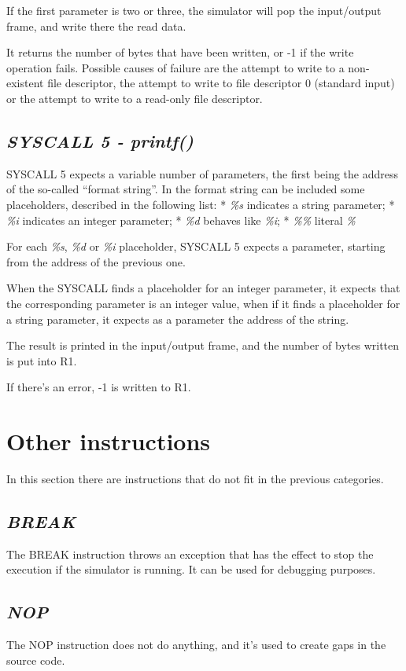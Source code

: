 \documentclass[letterpaper,10pt,english]{sphinxmanual}
\begin{document}
If the first parameter is two or three, the simulator will pop the input/output
frame, and write there the read data.

It returns the number of bytes that have been written, or -1 if the write
operation fails. Possible causes of failure are the attempt to write to a
non-existent file descriptor, the attempt to write to file descriptor 0
(standard input) or the attempt to write to a read-only file descriptor.


\subsection{\emph{SYSCALL 5 - printf()}}
\label{instructions:syscall-5-printf}
SYSCALL 5 expects a variable number of parameters, the first being the address
of the so-called ``format string''. In the format string can be included some
placeholders, described in the following list:
* \emph{\%s} indicates a string parameter;
* \emph{\%i} indicates an integer parameter;
* \emph{\%d} behaves like \emph{\%i};
* \emph{\%\%} literal \emph{\%}

For each \emph{\%s}, \emph{\%d} or \emph{\%i} placeholder, SYSCALL 5 expects a parameter,
starting from the address of the previous one.

When the SYSCALL finds a placeholder for an integer parameter, it expects that
the corresponding parameter is an integer value, when if it finds a placeholder
for a string parameter, it expects as a parameter the address of the string.

The result is printed in the input/output frame, and the number of bytes
written is put into R1.

If there's an error, -1 is written to R1.


\section{Other instructions}
\label{instructions:other-instructions}
In this section there are instructions that do not fit in the previous
categories.


\subsection{\emph{BREAK}}
\label{instructions:break}
The BREAK instruction throws an exception that has the effect to stop the
execution if the simulator is running. It can be used for debugging purposes.


\subsection{\emph{NOP}}
\label{instructions:nop}
The NOP instruction does not do anything, and it's used to create gaps in the
source code.
\end{document}
